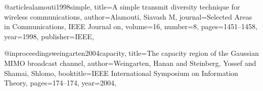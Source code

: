 \begin{thebibliography}{9}
	@article{alamouti1998simple,
		title={A simple transmit diversity technique for wireless communications},
		author={Alamouti, Siavash M},
		journal={Selected Areas in Communications, IEEE Journal on},
		volume={16},
		number={8},
		pages={1451--1458},
		year={1998},
		publisher={IEEE},
	}
	
	@inproceedings{weingarten2004capacity,
		title={The capacity region of the Gaussian MIMO broadcast channel},
		author={Weingarten, Hanan and Steinberg, Yossef and Shamai, Shlomo},
		booktitle={IEEE International Symposium on Information Theory},
		pages={174--174},
		year={2004},
	}
\end{thebibliography}